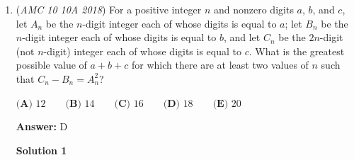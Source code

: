 \begin{enumerate}
 Adding these up, we see that the ratio of [BGFD] to [ABC] is 15/24=5/8. 5/8*120 yields our answer of 75. ~mathboy282

 



\textbf{Solution 9}

Draw a nice diagram. Lets find some some areas. We will start by finding $[AED]$. The side length ratio of $\triangle{AED}$ to $\triangle{ACB}$ is $\dfrac{1}{2}$, so the area ratio is $\dfrac{1}{4}$, so $[AED] = \dfrac{1}{4} \cdot 120 = 30$. Lets look for information we have used yet. We still havent used the fact that $AG$ is an angle bisector. This hints at us using the angle bisector theorem. Letting $EF = y$, we have $FD = 5y$, and letting $CG = x$, $GB = 5x$. Now, we have
 \[\dfrac{[AEF]}{[AED]} = \dfrac{1}{6} \Longrightarrow [AEF] = \dfrac{1}{6} \cdot 30 = 5, [AFD] = \dfrac{5}{6} \cdot 30 = 25\]. Doing the same thing with triangles $ACG$ and $AGB$, we find that $[AGB] = 100$, and so $[FDGB] = 100-25 = \boxed{75}$

 -jb2015007

 \href{https://artofproblemsolving.com/videos/amc/2018amc10a/469}{https://artofproblemsolving.com/videos/amc/2018amc10a/469}

 


	\item (\textit{AMC 10 10A 2018}) For a positive integer $n$ and nonzero digits $a$, $b$, and $c$, let $A_n$ be the $n$-digit integer each of whose digits is equal to $a$; let $B_n$ be the $n$-digit integer each of whose digits is equal to $b$, and let $C_n$ be the $2n$-digit (not $n$-digit) integer each of whose digits is equal to $c$. What is the greatest possible value of $a + b + c$ for which there are at least two values of $n$ such that $C_n - B_n = A_n^2$?


 $\textbf{(A) } 12 \qquad \textbf{(B) } 14 \qquad \textbf{(C) } 16 \qquad \textbf{(D) } 18 \qquad \textbf{(E) } 20$

 \textbf{Answer: }D



\textbf{Solution 1}


\end{enumerate}

